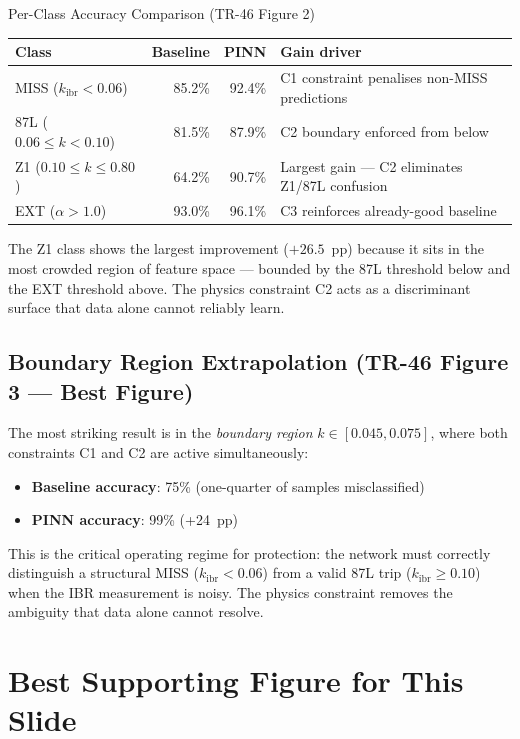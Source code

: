 \documentclass[12pt,a4paper]{article}
\newcommand{\kibr}{k_\mathrm{ibr}}
\begin{document}
\begin{resultbox}{Per-Class Accuracy Comparison (TR-46 Figure 2)}
\begin{tabular}{@{}lrrl@{}}
\toprule
\textbf{Class} & \textbf{Baseline} & \textbf{PINN} & \textbf{Gain driver} \\
\midrule
MISS ($\kibr < 0.06$)            & 85.2\% & 92.4\% & C1 constraint penalises non-MISS predictions \\
87L ($0.06 \leq k < 0.10$)      & 81.5\% & 87.9\% & C2 boundary enforced from below \\
Z1 ($0.10 \leq k \leq 0.80$)    & 64.2\% & 90.7\% & Largest gain — C2 eliminates Z1/87L confusion \\
EXT ($\alpha > 1.0$)             & 93.0\% & 96.1\% & C3 reinforces already-good baseline \\
\bottomrule
\end{tabular}

\medskip
The Z1 class shows the largest improvement ($+26.5$~pp) because it sits in the most crowded region of feature space — bounded by the 87L threshold below and the EXT threshold above. The physics constraint C2 acts as a discriminant surface that data alone cannot reliably learn.
\end{resultbox}

\subsection{Boundary Region Extrapolation (TR-46 Figure 3 — Best Figure)}

The most striking result is in the \textit{boundary region} $k \in [0.045, 0.075]$, where both constraints C1 and C2 are active simultaneously:

\begin{itemize}[nosep]
  \item \textbf{Baseline accuracy}: 75\% (one-quarter of samples misclassified)
  \item \textbf{PINN accuracy}: 99\% (+24~pp)
\end{itemize}

This is the critical operating regime for protection: the network must correctly distinguish a structural MISS ($\kibr < 0.06$) from a valid 87L trip ($\kibr \geq 0.10$) when the IBR measurement is noisy. The physics constraint removes the ambiguity that data alone cannot resolve.

\section{Best Supporting Figure for This Slide}
\end{document}
